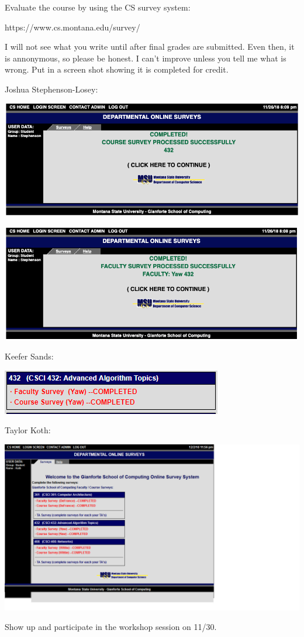 \documentclass[12pt]{article}
\newenvironment{problem}[2][Problem]
{\begin{trivlist}
\item[\hskip \labelsep {\bfseries #1}\hskip \labelsep {\bfseries #2.}]}{\end{trivlist}}
\begin{document}
\begin{problem}{3*}
Evaluate the course by using the CS survey system: 

https://www.cs.montana.edu/survey/

I will not see what you write until after final grades are submitted. Even then, it is annonymous, so please be honest. I can't improve unless you tell me what is wrong. Put in a screen shot showing it is completed for credit.

Joshua Stephenson-Losey:

\includegraphics[scale = .33]{Surveys/SL_432.png}

\includegraphics[scale = .33]{Surveys/SL_432_yaw.png}

Keefer Sands:

\includegraphics{Surveys/KsandsSurvey.PNG}

Taylor Koth:

\includegraphics[scale = .33]{Surveys/Koth_Survey_Screenshot.png}

\end{problem}

\begin{problem}{4}
Show up and participate in the workshop session on 11/30.
\end{problem}
 
\end{document}
